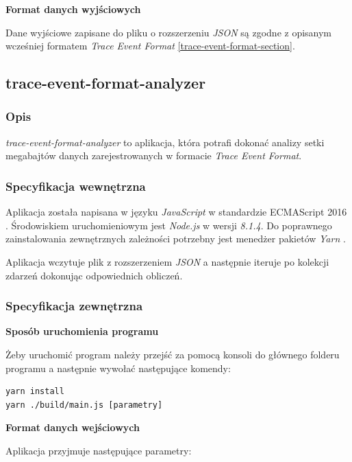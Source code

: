 \documentclass[polish, twoside, 12pt]{mwart}
\begin{document}
\textbf{Format danych wyjściowych} \newline

Dane wyjściowe zapisane do pliku o rozszerzeniu \emph{JSON} są zgodne z opisanym wcześniej formatem \emph
{Trace Event Format} \ref{trace-event-format-section}.

\subsection{trace-event-format-analyzer}

\subsubsection{Opis}

\emph{trace-event-format-analyzer} to aplikacja, która potrafi dokonać analizy setki megabajtów danych zarejestrowanych w formacie \emph{Trace Event Format}.

\subsubsection{Specyfikacja wewnętrzna}

Aplikacja została napisana w języku \emph{JavaScript} w standardzie ECMAScript 2016 \cite{es2016}. Środowiskiem uruchomieniowym jest \emph{Node.js} \cite{node.js} w wersji \emph{8.1.4}. Do poprawnego zainstalowania zewnętrznych zależności potrzebny jest menedżer pakietów \emph{Yarn} \cite{yarn}.

Aplikacja wczytuje plik z rozszerzeniem \emph{JSON} a następnie iteruje po kolekcji zdarzeń dokonując odpowiednich obliczeń.

\subsubsection{Specyfikacja zewnętrzna}

\textbf{Sposób uruchomienia programu} \newline

Żeby uruchomić program należy przejść za pomocą konsoli do głównego folderu programu a następnie wywołać następujące komendy:

\begin{lstlisting}
yarn install
yarn ./build/main.js [parametry]
\end{lstlisting}

\textbf{Format danych wejściowych} \newline

Aplikacja przyjmuje następujące parametry:
\end{document}
